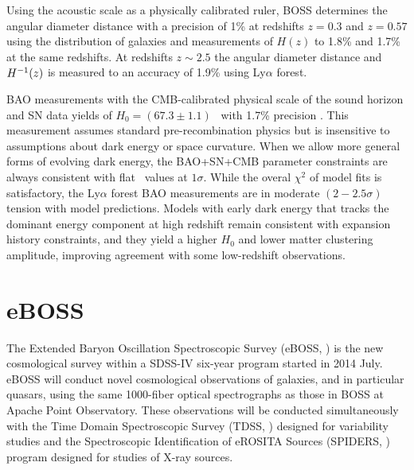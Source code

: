 Using the acoustic scale as a physically calibrated ruler, BOSS determines the angular diameter distance with a precision of 1\% at redshifts $z = 0.3$ and $z = 0.57$ using the distribution of galaxies and measurements of $H(z)$ to 1.8\% and 1.7\%  at the same redshifts. At redshifts $z\sim2.5$ the  angular diameter distance and $H^{-1}(z)$ is measured to an accuracy of 1.9\% using Ly$\alpha$ forest.

BAO measurements with the CMB-calibrated physical scale of the sound horizon and SN data yields of $H_0=(67.3\pm1.1)$ \unith\ with 1.7\% precision \cite{BOSS_results}. This measurement assumes standard pre-recombination physics but is insensitive to assumptions about dark energy or space curvature. When we allow more general forms of evolving dark energy, the BAO+SN+CMB parameter constraints are always consistent with flat \LCDM\ values at $1\sigma$. While the overal $\chi^2$ of model fits is satisfactory, the Ly$\alpha$ forest BAO measurements are in moderate $(2-2.5\sigma)$ tension with model predictions. Models with early dark energy that tracks the dominant energy component at high redshift remain consistent with expansion history constraints, and they yield a higher $H_0$ and lower matter clustering amplitude, improving agreement with some low-redshift observations.

\section{eBOSS}
The Extended Baryon Oscillation Spectroscopic Survey (eBOSS, \cite{2016AJ....151...44D}) is the new cosmological survey within a SDSS-IV six-year program started in 2014 July. eBOSS will conduct novel cosmological observations of galaxies, and in particular quasars, using the same 1000-fiber optical spectrographs as those in BOSS at Apache Point Observatory. These observations will be conducted simultaneously with the Time Domain Spectroscopic Survey (TDSS, \cite{2015ApJ...806..244M}) designed for variability studies and the Spectroscopic Identification of eROSITA Sources (SPIDERS, \cite{2010SPIE.7741E..1NF}) program designed for studies of X-ray sources.

